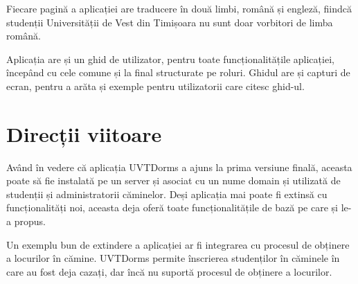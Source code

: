 \documentclass[12pt,a4paper]{report}
\theoremstyle{definition}
\theoremstyle{remark}
\begin{document}
\par Fiecare pagină a aplicației are traducere în două limbi, română și engleză, fiindcă studenții Universității de Vest din Timișoara nu sunt doar vorbitori de limba română.

\par Aplicația are și un ghid de utilizator, pentru toate funcționalitățile aplicației, începând cu cele comune și la final structurate pe roluri. Ghidul are și capturi de ecran, pentru a arăta și exemple pentru utilizatorii care citesc ghid-ul.

\section{Direcții viitoare}

\par Având în vedere că aplicația UVTDorms a ajuns la prima versiune finală, aceasta poate să fie instalată pe un server și asociat cu un nume domain și utilizată de studenții și administratorii căminelor. Deși aplicația mai poate fi extinsă cu funcționalități noi, aceasta deja oferă toate funcționalitățile de bază pe care și le-a propus.

\par Un exemplu bun de extindere a aplicației ar fi integrarea cu procesul de obținere a locurilor în cămine. UVTDorms permite înscrierea studenților în căminele în care au fost deja cazați, dar încă nu suportă procesul de obținere a locurilor.



\end{document}

